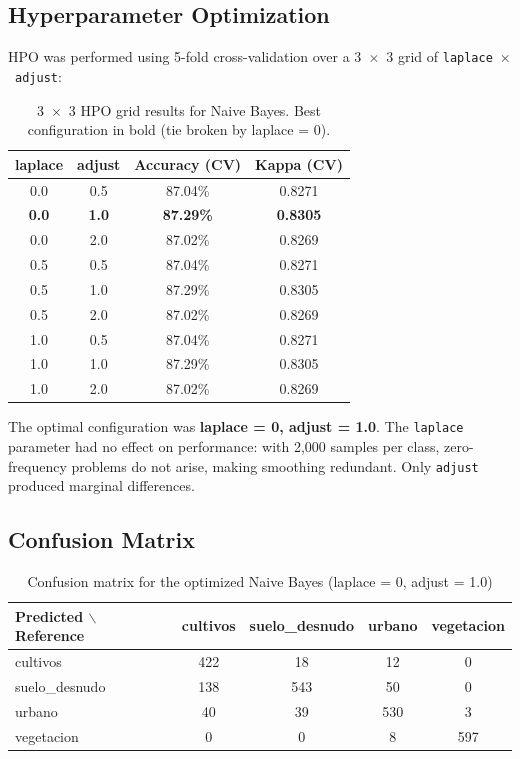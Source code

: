 \documentclass[12pt,a4paper]{article}
\begin{document}
\subsection{Hyperparameter Optimization}

HPO was performed using 5-fold cross-validation over a 3~$\times$~3 grid of \texttt{laplace}~$\times$~\texttt{adjust}:

\begin{table}[H]
\centering
\begin{tabular}{|c|c|c|c|}
\hline
\textbf{laplace} & \textbf{adjust} & \textbf{Accuracy (CV)} & \textbf{Kappa (CV)} \\
\hline
0.0 & 0.5 & 87.04\% & 0.8271 \\
\textbf{0.0} & \textbf{1.0} & \textbf{87.29\%} & \textbf{0.8305} \\
0.0 & 2.0 & 87.02\% & 0.8269 \\
0.5 & 0.5 & 87.04\% & 0.8271 \\
0.5 & 1.0 & 87.29\% & 0.8305 \\
0.5 & 2.0 & 87.02\% & 0.8269 \\
1.0 & 0.5 & 87.04\% & 0.8271 \\
1.0 & 1.0 & 87.29\% & 0.8305 \\
1.0 & 2.0 & 87.02\% & 0.8269 \\
\hline
\end{tabular}
\caption{3~$\times$~3 HPO grid results for Naive Bayes. Best configuration in bold (tie broken by laplace = 0).}
\end{table}

The optimal configuration was \textbf{laplace = 0, adjust = 1.0}. The \texttt{laplace} parameter had no effect on performance: with 2,000 samples per class, zero-frequency problems do not arise, making smoothing redundant. Only \texttt{adjust} produced marginal differences.

\subsection{Confusion Matrix}

\begin{table}[H]
\centering
\begin{tabular}{|l|c|c|c|c|}
\hline
\textbf{Predicted $\backslash$ Reference} & \textbf{cultivos} & \textbf{suelo\_desnudo} & \textbf{urbano} & \textbf{vegetacion} \\
\hline
cultivos       & 422 &  18 &  12 &   0 \\
\hline
suelo\_desnudo & 138 & 543 &  50 &   0 \\
\hline
urbano         &  40 &  39 & 530 &   3 \\
\hline
vegetacion     &   0 &   0 &   8 & 597 \\
\hline
\end{tabular}
\caption{Confusion matrix for the optimized Naive Bayes (laplace = 0, adjust = 1.0)}
\end{table}
\end{document}
